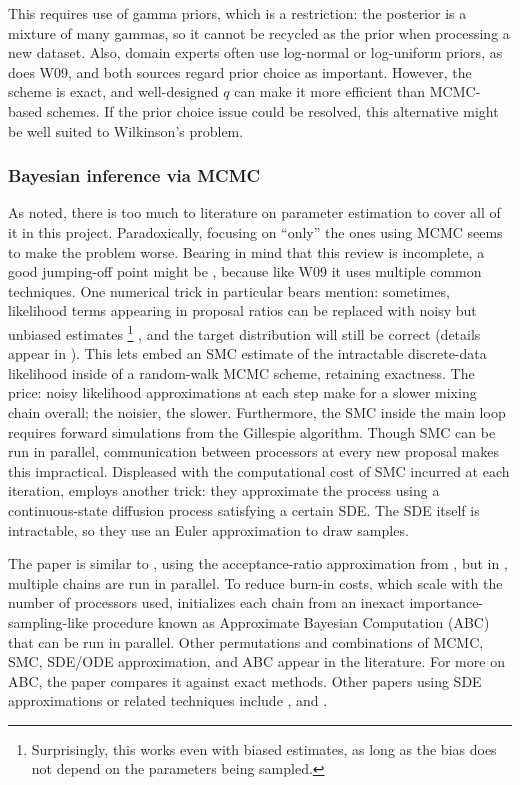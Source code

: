 \documentclass{article}
\begin{document}
This requires use of gamma priors, which is a restriction: the posterior is a mixture of many gammas, so it cannot be recycled as the prior when processing a new dataset. Also, domain experts 
often use log-normal or log-uniform priors, as does W09, and both sources regard prior choice as important. However, the scheme is exact, and well-designed $q$ can make it more efficient than MCMC-based schemes. If the prior choice issue could be resolved, this alternative might be well suited to Wilkinson's problem. 

\subsubsection{Bayesian inference via MCMC}
As noted, there is too much to literature on parameter estimation to cover all of it in this project. Paradoxically, focusing on ``only'' the ones using MCMC seems to make the problem worse. Bearing in mind that this review is incomplete, a good jumping-off point might be \cite{golightly2011bayesian}, because like W09 it uses multiple common techniques. One numerical trick in particular bears mention: sometimes, likelihood terms appearing in proposal ratios can be replaced with noisy but unbiased estimates 
%
\footnote{Surprisingly, this works even with biased estimates, as long as the bias does not depend on the parameters being sampled.}
%
, and the target distribution will still be correct (details appear in \cite{andrieu2010particle}). This lets \cite{golightly2011bayesian} embed an SMC estimate of the intractable discrete-data likelihood inside of a random-walk MCMC scheme, retaining exactness. The price: noisy likelihood approximations at each step make for a slower mixing chain overall; the noisier, the slower. Furthermore, the SMC inside the main loop requires forward simulations from the Gillespie algorithm. Though SMC can be run in parallel, communication between processors at every new proposal makes this impractical. Displeased with the computational cost of SMC incurred at each iteration, \cite{golightly2011bayesian} employs another trick: they approximate the process using a continuous-state diffusion process satisfying a certain SDE. The SDE itself is intractable, so they use an Euler approximation to draw samples. 

The paper \cite{owen2014scalable} is similar to \cite{golightly2011bayesian}, using the acceptance-ratio approximation from \cite{andrieu2010particle}, but in \cite{owen2014scalable}, multiple chains are run in parallel. To reduce burn-in costs, which scale with the number of processors used, \cite{owen2014scalable} initializes each chain from an inexact importance-sampling-like procedure known as Approximate Bayesian Computation (ABC) that can be run in parallel. Other permutations and combinations of MCMC, SMC, SDE/ODE approximation, and ABC appear in the literature. For more on ABC, the paper \cite{owen2014ABC_LF-MCMCcomparison} compares it against exact methods. Other papers using SDE approximations or related techniques include \cite{golightly2005bayesian}, \cite{Boys2008} and \cite{fearnhead2014inference}.
\end{document}
